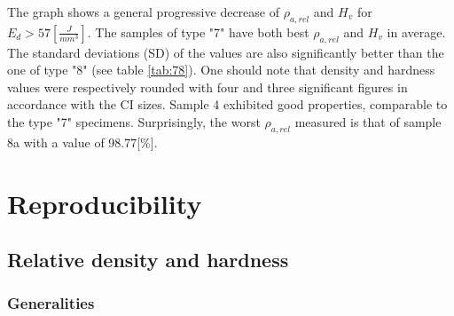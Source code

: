 The graph shows a general progressive decrease of  $\rho_{a,rel}$ and $H_v$ for $E_d>57 [\frac{J}{mm^3}]$. The samples of type "7" have both best $\rho_{a,rel}$ and $H_v$ in average. The standard deviations (SD) of the values are also significantly better than the one of type "8" (see table \ref{tab:78}). One should note that density and hardness values were respectively rounded with four and three significant figures in accordance with the CI sizes. Sample 4 exhibited good properties, comparable to the type "7" specimens. Surprisingly, the worst $\rho_{a,rel}$ measured is that of sample 8a with a value of 98.77[\%].  \\

 \begin{center}
\begin{table}[ht]
\noindent{}

\caption[Comparison of mean apparent relative densities and hardnesses of types 7 and 8 specimens of batch X200-171024]{Comparison of mean apparent relative densities and hardnesses of types 7 and 8 specimens of batch X200-171024}
\label{tab:78}
\end{table}
 \end{center}

\section{Reproducibility}
\label{RReprod}
\subsection{Relative density and hardness}
\subsubsection{Generalities}

